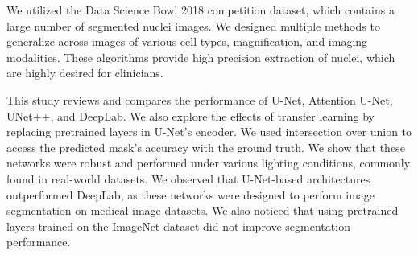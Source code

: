 \documentclass[conference]{IEEEtran}
\begin{document}
We utilized the Data Science Bowl 2018 competition dataset, which contains a large number of segmented nuclei images. We designed multiple methods to generalize across images of various cell types, magnification, and imaging modalities. These algorithms provide high precision extraction of nuclei, which are highly desired for clinicians. 

This study reviews and compares the performance of U-Net, Attention U-Net, UNet++, and DeepLab. We also explore the effects of transfer learning by replacing pretrained layers in U-Net's encoder. We used intersection over union to access the predicted mask's accuracy with the ground truth. We show that these networks were robust and performed under various lighting conditions, commonly found in real-world datasets. We observed that U-Net-based architectures outperformed DeepLab, as these networks were designed to perform image segmentation on medical image datasets. We also noticed that using pretrained layers trained on the ImageNet dataset did not improve segmentation performance.



\end{document}
